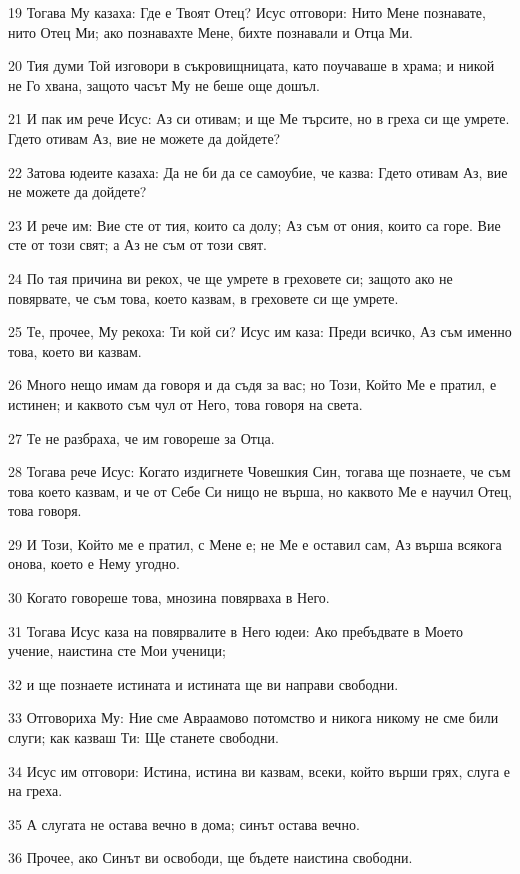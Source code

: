 \par 19 Тогава Му казаха: Где е Твоят Отец? Исус отговори: Нито Мене познавате, нито Отец Ми; ако познавахте Мене, бихте познавали и Отца Ми.
\par 20 Тия думи Той изговори в съкровищницата, като поучаваше в храма; и никой не Го хвана, защото часът Му не беше още дошъл.
\par 21 И пак им рече Исус: Аз си отивам; и ще Ме търсите, но в греха си ще умрете. Гдето отивам Аз, вие не можете да дойдете?
\par 22 Затова юдеите казаха: Да не би да се самоубие, че казва: Гдето отивам Аз, вие не можете да дойдете?
\par 23 И рече им: Вие сте от тия, които са долу; Аз съм от ония, които са горе. Вие сте от този свят; а Аз не съм от този свят.
\par 24 По тая причина ви рекох, че ще умрете в греховете си; защото ако не повярвате, че съм това, което казвам, в греховете си ще умрете.
\par 25 Те, прочее, Му рекоха: Ти кой си? Исус им каза: Преди всичко, Аз съм именно това, което ви казвам.
\par 26 Много нещо имам да говоря и да съдя за вас; но Този, Който Ме е пратил, е истинен; и каквото съм чул от Него, това говоря на света.
\par 27 Те не разбраха, че им говореше за Отца.
\par 28 Тогава рече Исус: Когато издигнете Човешкия Син, тогава ще познаете, че съм това което казвам, и че от Себе Си нищо не върша, но каквото Ме е научил Отец, това говоря.
\par 29 И Този, Който ме е пратил, с Мене е; не Ме е оставил сам, Аз върша всякога онова, което е Нему угодно.
\par 30 Когато говореше това, мнозина повярваха в Него.
\par 31 Тогава Исус каза на повярвалите в Него юдеи: Ако пребъдвате в Моето учение, наистина сте Мои ученици;
\par 32 и ще познаете истината и истината ще ви направи свободни.
\par 33 Отговориха Му: Ние сме Авраамово потомство и никога никому не сме били слуги; как казваш Ти: Ще станете свободни.
\par 34 Исус им отговори: Истина, истина ви казвам, всеки, който върши грях, слуга е на греха.
\par 35 А слугата не остава вечно в дома; синът остава вечно.
\par 36 Прочее, ако Синът ви освободи, ще бъдете наистина свободни.
